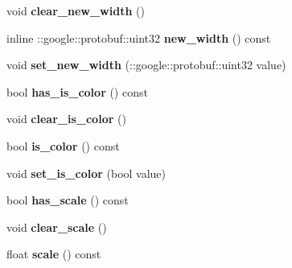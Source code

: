 \begin{DoxyCompactItemize}
void {\bfseries clear\+\_\+new\+\_\+width} ()
\item 
\mbox{\label{classcaffe_1_1_image_data_parameter_a0acbf3413d440101c4ea2ea1c5dd0982}} 
inline \+::google\+::protobuf\+::uint32 {\bfseries new\+\_\+width} () const
\item 
\mbox{\label{classcaffe_1_1_image_data_parameter_aafed93a43742053f145c67332a22ff01}} 
void {\bfseries set\+\_\+new\+\_\+width} (\+::google\+::protobuf\+::uint32 value)
\item 
\mbox{\label{classcaffe_1_1_image_data_parameter_a6fbd82897f98599d0b7b0469c76dee89}} 
bool {\bfseries has\+\_\+is\+\_\+color} () const
\item 
\mbox{\label{classcaffe_1_1_image_data_parameter_adbee8b086028c3c3de607881d433fad3}} 
void {\bfseries clear\+\_\+is\+\_\+color} ()
\item 
\mbox{\label{classcaffe_1_1_image_data_parameter_a6aa47c39f977b330748a49b41fccb53d}} 
bool {\bfseries is\+\_\+color} () const
\item 
\mbox{\label{classcaffe_1_1_image_data_parameter_a05a4831a9dbd426dcaad56b2893270c8}} 
void {\bfseries set\+\_\+is\+\_\+color} (bool value)
\item 
\mbox{\label{classcaffe_1_1_image_data_parameter_a36b2db6ea4135a3d39e63bfca7a94914}} 
bool {\bfseries has\+\_\+scale} () const
\item 
\mbox{\label{classcaffe_1_1_image_data_parameter_a680f673a0dcbefa06f77336ff9d4488c}} 
void {\bfseries clear\+\_\+scale} ()
\item 
\mbox{\label{classcaffe_1_1_image_data_parameter_a5e9779696987fe37a690934ce87c84e7}} 
float {\bfseries scale} () const
\item 
\mbox{\label{classcaffe_1_1_image_data_parameter_a4961893e7f5aad97e06a6692d5e47da3}} 

\end{DoxyCompactItemize}
